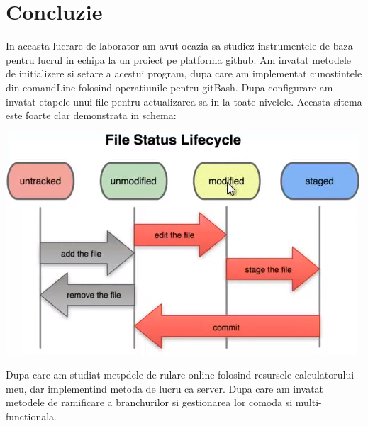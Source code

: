\section*{Concluzie}


In aceasta lucrare de laborator am avut ocazia sa studiez instrumentele de baza pentru lucrul in echipa la un proiect pe platforma github. Am invatat metodele de initializere si setare a acestui program, dupa care am implementat cunostintele din comandLine folosind operatiunile pentru gitBash. Dupa configurare am invatat etapele unui file pentru actualizarea sa in la toate nivelele. Aceasta sitema este foarte clar demonstrata in schema:
\begin{center}
\includegraphics[width=0.7\linewidth]{19concluzie}
\end{center}
Dupa care am studiat metpdele de rulare online folosind resursele calculatorului meu, dar implementind metoda de lucru ca server. Dupa care am invatat metodele de ramificare a branchurilor si gestionarea lor comoda si multi-functionala.

\clearpage